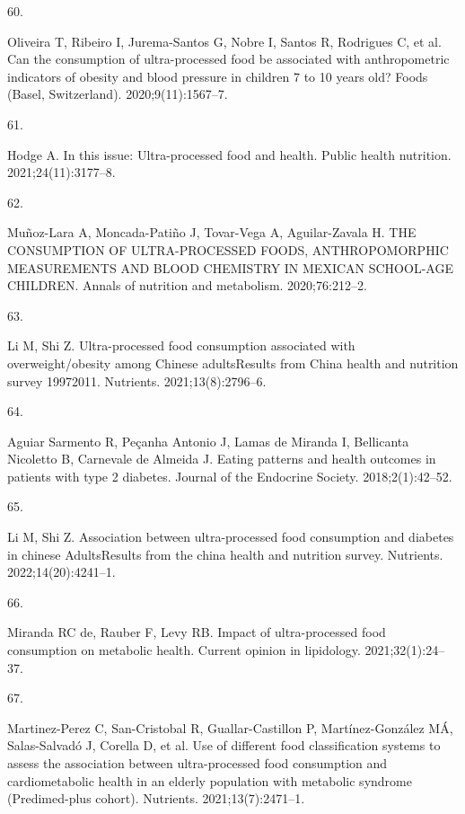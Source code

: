 \documentclass[
]{article}
\newlength{\cslhangindent}
\newlength{\csllabelwidth}
\newlength{\cslentryspacingunit} %
\newenvironment{CSLReferences}[2] %
 {%
  \setlength{\parindent}{0pt}
  \ifodd #1
  \let\oldpar\par
  \def\par{\hangindent=\cslhangindent\oldpar}
  \fi
  \setlength{\parskip}{#2\cslentryspacingunit}
 }%
 {}
\newcommand{\CSLLeftMargin}[1]{\parbox[t]{\csllabelwidth}{#1}}
\newcommand{\CSLRightInline}[1]{\parbox[t]{\linewidth - \csllabelwidth}{#1}\break}
\begin{document}
\begin{CSLReferences}{0}{0}
\leavevmode{}%
\CSLLeftMargin{60. }%
\CSLRightInline{Oliveira T, Ribeiro I, Jurema-Santos G, Nobre I, Santos
R, Rodrigues C, et al. Can the consumption of ultra-processed food be
associated with anthropometric indicators of obesity and blood pressure
in children 7 to 10 years old? Foods (Basel, Switzerland).
2020;9(11):1567--7. }

\leavevmode{}%
\CSLLeftMargin{61. }%
\CSLRightInline{Hodge A. In this issue: Ultra-processed food and health.
Public health nutrition. 2021;24(11):3177--8. }

\leavevmode{}%
\CSLLeftMargin{62. }%
\CSLRightInline{Muñoz-Lara A, Moncada-Patiño J, Tovar-Vega A,
Aguilar-Zavala H. THE CONSUMPTION OF ULTRA-PROCESSED FOODS,
ANTHROPOMORPHIC MEASUREMENTS AND BLOOD CHEMISTRY IN MEXICAN SCHOOL-AGE
CHILDREN. Annals of nutrition and metabolism. 2020;76:212--2. }

\leavevmode{}%
\CSLLeftMargin{63. }%
\CSLRightInline{Li M, Shi Z. Ultra-processed food consumption associated
with overweight/obesity among Chinese adults{\textemdash}Results from
China health and nutrition survey 1997{\textendash}2011. Nutrients.
2021;13(8):2796--6. }

\leavevmode{}%
\CSLLeftMargin{64. }%
\CSLRightInline{Aguiar Sarmento R, Peçanha Antonio J, Lamas de Miranda
I, Bellicanta Nicoletto B, Carnevale de Almeida J. Eating patterns and
health outcomes in patients with type 2 diabetes. Journal of the
Endocrine Society. 2018;2(1):42--52. }

\leavevmode{}%
\CSLLeftMargin{65. }%
\CSLRightInline{Li M, Shi Z. Association between ultra-processed food
consumption and diabetes in chinese Adults{\textemdash}Results from the
china health and nutrition survey. Nutrients. 2022;14(20):4241--1. }

\leavevmode{}%
\CSLLeftMargin{66. }%
\CSLRightInline{Miranda RC de, Rauber F, Levy RB. Impact of
ultra-processed food consumption on metabolic health. Current opinion in
lipidology. 2021;32(1):24--37. }

\leavevmode{}%
\CSLLeftMargin{67. }%
\CSLRightInline{Martinez-Perez C, San-Cristobal R, Guallar-Castillon P,
Martínez-González MÁ, Salas-Salvadó J, Corella D, et al. Use of
different food classification systems to assess the association between
ultra-processed food consumption and cardiometabolic health in an
elderly population with metabolic syndrome (Predimed-plus cohort).
Nutrients. 2021;13(7):2471--1. }


\end{CSLReferences}
\end{document}
